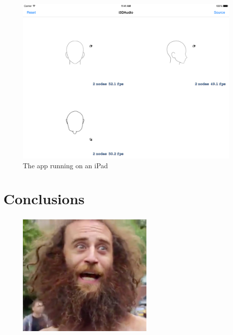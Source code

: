 \documentclass{beamer}
\begin{document}
	\begin{frame}
		\frametitle{\insertsection}
		\begin{figure}
			\centering
			\includegraphics[width=1.0\textheight]{images/iOS_screenshot_0.png}
			\caption{The app running on an iPad}
			\label{fig:ios_app}
		\end{figure}
	\end{frame}

	\section{Conclusions}

	\begin{frame}
		\frametitle{\insertsection}
		\begin{figure}
			\centering
			\includegraphics[width=0.6\textwidth]{images/alas.jpg}
		\end{figure}
	\end{frame}
\end{document}
